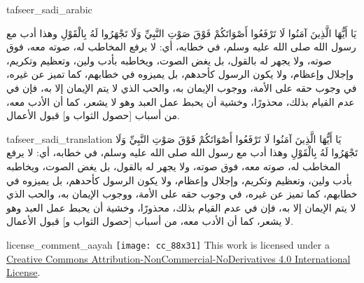 \begin{taggedblock}{tafseer_sadi_arabic}
\begin{Arabic}
{ يَا أَيُّهَا الَّذِينَ آمَنُوا لَا تَرْفَعُوا أَصْوَاتَكُمْ فَوْقَ صَوْتِ النَّبِيِّ وَلَا تَجْهَرُوا لَهُ بِالْقَوْلِ }
وهذا أدب مع رسول الله صلى الله عليه وسلم، في خطابه، أي: لا يرفع المخاطب له، صوته معه، فوق صوته، ولا يجهر له بالقول، بل يغض الصوت، ويخاطبه بأدب ولين، وتعظيم وتكريم، وإجلال وإعظام، ولا يكون الرسول كأحدهم، بل يميزوه في خطابهم، كما تميز عن غيره، في وجوب حقه على الأمة، ووجوب الإيمان به، والحب الذي لا يتم الإيمان إلا به، فإن في عدم القيام بذلك، محذورًا، وخشية أن يحبط عمل العبد وهو لا يشعر، كما أن الأدب معه، من أسباب
[حصول الثواب و]
قبول الأعمال.
\end{Arabic}
\end{taggedblock}
\begin{taggedblock}{tafseer_sadi_translation}
{ يَا أَيُّهَا الَّذِينَ آمَنُوا لَا تَرْفَعُوا أَصْوَاتَكُمْ فَوْقَ صَوْتِ النَّبِيِّ وَلَا تَجْهَرُوا لَهُ بِالْقَوْلِ }
وهذا أدب مع رسول الله صلى الله عليه وسلم، في خطابه، أي: لا يرفع المخاطب له، صوته معه، فوق صوته، ولا يجهر له بالقول، بل يغض الصوت، ويخاطبه بأدب ولين، وتعظيم وتكريم، وإجلال وإعظام، ولا يكون الرسول كأحدهم، بل يميزوه في خطابهم، كما تميز عن غيره، في وجوب حقه على الأمة، ووجوب الإيمان به، والحب الذي لا يتم الإيمان إلا به، فإن في عدم القيام بذلك، محذورًا، وخشية أن يحبط عمل العبد وهو لا يشعر، كما أن الأدب معه، من أسباب
[حصول الثواب و]
قبول الأعمال.
\end{taggedblock}
\begin{taggedblock}{license_comment_aayah}
\texttt{[image: cc\_88x31]}
This work is licensed under a 
\href{http://creativecommons.org/licenses/by-nc-nd/4.0/}{Creative Commons Attribution-NonCommercial-NoDerivatives 4.0 International License}.
\end{taggedblock}
\begin{comment}
Please use the following for footnotes:- Sample\footnoteQ{Text of Qur'an footnote goes here.}.
Sample\footnoteT{Text of Tafseer footnote goes here.}.
\end{comment}